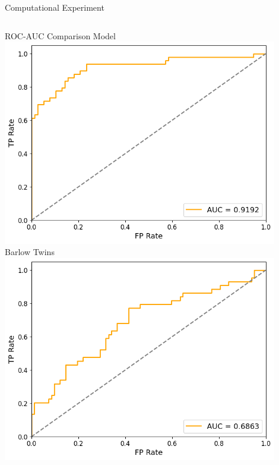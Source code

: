 \documentclass{beamer}
\begin{document}
\begin{frame}{Computational Experiment}
\begin{columns}[T]
    \vspace{-4mm}
    \begin{block}{ROC-AUC Comparison}
        \centering
        \vspace{-2mm}
        {\tiny Model} \\
        \includegraphics[width=0.9\textwidth]{fig/roc-curve-model.png} \\
        \vspace{-2mm}
        {\tiny Barlow Twins} \\
        \includegraphics[width=0.9\textwidth]{fig/roc-curve-BT.png}
    \end{block}


\end{columns}
\end{frame}
\end{document}
